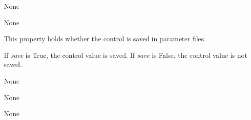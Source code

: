 \documentclass[letterpaper,10pt,english]{sphinxmanual}
\begin{document}
\begin{fulllineitems}
\begin{fulllineitems}
\end{fulllineitems}


\begin{fulllineitems}
\label{api:controls.TextIOBox.readlines}
None

\end{fulllineitems}


\begin{fulllineitems}
\label{api:controls.TextIOBox.reset}
None

\end{fulllineitems}


\begin{fulllineitems}
\label{api:controls.TextIOBox.save}
This property holds whether the control is saved in parameter files.

If \emph{save} is True, the control value is saved.
If \emph{save} is False, the control value is not saved.

\end{fulllineitems}


\begin{fulllineitems}
\label{api:controls.TextIOBox.scroll}
None

\end{fulllineitems}


\begin{fulllineitems}
\label{api:controls.TextIOBox.seek}
None

\end{fulllineitems}


\begin{fulllineitems}
\label{api:controls.TextIOBox.tell}
None


\end{fulllineitems}
\end{fulllineitems}
\end{document}
